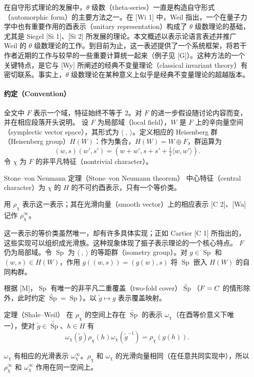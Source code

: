 在自守形式理论的发展中，$\theta$ 级数（theta-series）一直是构造自守形式（automorphic form）的主要方法之一。在 [Wi 1] 中，Weil 指出，一个在量子力学中也有重要作用的酉表示（unitary representation）构成了 $\theta$ 级数理论的基础，尤其是 Siegel [Si 1]、[Si 2] 所发展的理论。本文概述以表示论语言表述并推广 Weil 的 $\theta$ 级数理论的工作。到目前为止，这一表述提供了一个系统框架，将若干作者近期的工作与较早的一些重要计算统一起来（例子见 [G]）。这种方法的一个关键特点，是它与 [Wy] 所阐述的经典不变量理论（classical invariant theory）有密切联系。事实上，$\theta$ 级数理论在某种意义上似乎是经典不变量理论的超越版本。
\paragraph*{约定（Convention）}
全文中 $F$ 表示一个域，特征始终不等于 $2$。对 $F$ 的进一步假设随讨论内容而变，并在相应段落开头说明。
设 $F$ 为局部域（local field），$W$ 是 $F$ 上的辛向量空间（symplectic vector space），其形式为 $\langle\ ,\ \rangle$。定义相应的 Heisenberg 群（Heisenberg group）$H(W)$：作为集合，$H(W)=W\oplus F$，群运算为
\[
(w,s)(w',s')=(w+w',s+s'+\tfrac12\langle w,w'\rangle).
\]
令 $\chi$ 为 $F$ 的非平凡特征（nontrivial character）。
\begin{originaltheorem}{Stone--von Neumann 定理（Stone--von Neumann theorem）}
中心特征（central character）为 $\chi$ 的 $H$ 的不可约酉表示，只有一个等价类。
\end{originaltheorem}
用 $\rho_\chi$ 表示这一表示；其在光滑向量（smooth vector）上的相应表示 [C 2]、[Wa] 记作 $\rho_\chi^\infty$。

这一表示的等价类虽然唯一，却有许多具体实现；正如 Cartier [C 1] 所指出的，这些实现可以组织成光滑族。这种现象体现了振子表示理论的一个核心特点。
$F$ 仍为局部域。令 $\operatorname{Sp}$ 为 $\langle\ ,\ \rangle$ 的等距群（isometry group）。对 $g\in\operatorname{Sp}$ 和 $(w,s)\in H(W)$，作用 $g((w,s))=(g(w),s)$ 将 $\operatorname{Sp}$ 嵌入 $H(W)$ 的自同构群。

根据 [M]，$\operatorname{Sp}$ 有唯一的非平凡二重覆盖（two-fold cover）$\widetilde{\operatorname{Sp}}$（$F=C$ 的情形除外，此时约定 $\widetilde{\operatorname{Sp}}=\operatorname{Sp}$）。以 $\widetilde g\mapsto g$ 表示覆盖映射。
\begin{originaltheorem}{定理（Shale--Weil）}
在 $\rho_\chi$ 的空间上存在 $\widetilde{\operatorname{Sp}}$ 的表示 $\omega_\chi$（在酉等价意义下唯一），使对 $\widetilde g\in\widetilde{\operatorname{Sp}}$、$h\in H$ 有
\[
\omega_\chi(\widetilde g)\rho_\chi(h)\omega_\chi(\widetilde g^{-1})=\rho_\chi(g(h)).\tag{2.1}
\]
\end{originaltheorem}
$\omega_\chi$ 有相应的光滑表示 $\omega_\chi^\infty$。$\rho_\chi$ 和 $\omega_\chi$ 的光滑向量相同（在任意共同实现中），所以 $\rho_\chi^\infty$ 和 $\omega_\chi^\infty$ 作用在同一空间上。

